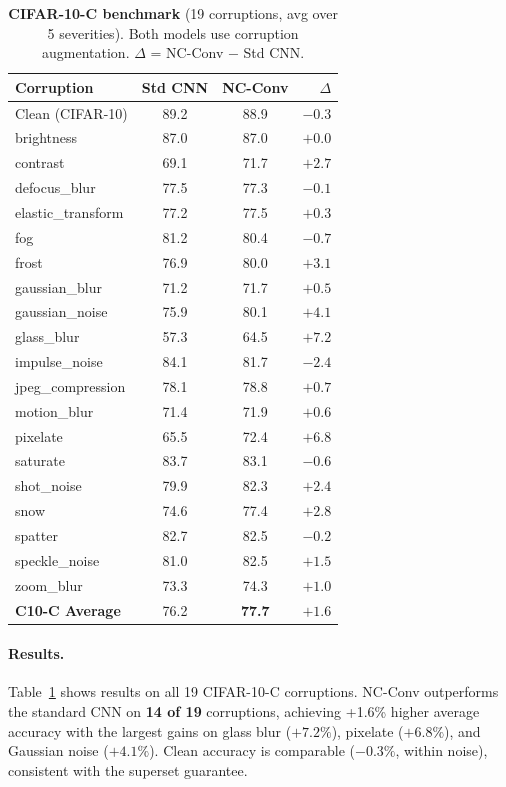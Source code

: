 \documentclass{bmvc2k}
\begin{document}
\begin{table}[t]
\centering
\caption{\textbf{CIFAR-10-C benchmark} (19 corruptions, avg over 5 severities). Both models use corruption augmentation. $\Delta$ = NC-Conv $-$ Std CNN.}
\label{tab:cifar10c}
\footnotesize
\setlength{\tabcolsep}{3.5pt}
\begin{tabular}{@{}lcc r@{}}
\toprule
\textbf{Corruption} & \textbf{Std CNN} & \textbf{NC-Conv} & $\Delta$ \\
\midrule
Clean (CIFAR-10)    & 89.2 & 88.9 & $-0.3$ \\
\midrule
brightness          & 87.0 & 87.0 & $+0.0$ \\
contrast            & 69.1 & 71.7 & $+2.7$ \\
defocus\_blur       & 77.5 & 77.3 & $-0.1$ \\
elastic\_transform  & 77.2 & 77.5 & $+0.3$ \\
fog                 & 81.2 & 80.4 & $-0.7$ \\
frost               & 76.9 & 80.0 & $+3.1$ \\
gaussian\_blur      & 71.2 & 71.7 & $+0.5$ \\
gaussian\_noise     & 75.9 & 80.1 & $+4.1$ \\
glass\_blur         & 57.3 & 64.5 & $\mathbf{+7.2}$ \\
impulse\_noise      & 84.1 & 81.7 & $-2.4$ \\
jpeg\_compression   & 78.1 & 78.8 & $+0.7$ \\
motion\_blur        & 71.4 & 71.9 & $+0.6$ \\
pixelate            & 65.5 & 72.4 & $\mathbf{+6.8}$ \\
saturate            & 83.7 & 83.1 & $-0.6$ \\
shot\_noise         & 79.9 & 82.3 & $+2.4$ \\
snow                & 74.6 & 77.4 & $+2.8$ \\
spatter             & 82.7 & 82.5 & $-0.2$ \\
speckle\_noise      & 81.0 & 82.5 & $+1.5$ \\
zoom\_blur          & 73.3 & 74.3 & $+1.0$ \\
\midrule
\textbf{C10-C Average} & 76.2 & \textbf{77.7} & $\mathbf{+1.6}$ \\
\bottomrule
\end{tabular}
\end{table}

\paragraph{Results.}
Table~\ref{tab:cifar10c} shows results on all 19 CIFAR-10-C corruptions.
NC-Conv outperforms the standard CNN on \textbf{14 of 19} corruptions, achieving +1.6\% higher average accuracy with the largest gains on glass blur ($+7.2\%$), pixelate ($+6.8\%$), and Gaussian noise ($+4.1\%$).
Clean accuracy is comparable ($-0.3\%$, within noise), consistent with the superset guarantee.
\end{document}
